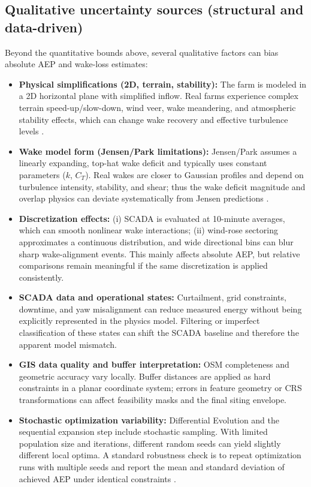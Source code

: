 \documentclass[lettersize,journal]{IEEEtran}
\begin{document}
\subsection{Qualitative uncertainty sources (structural and data-driven)}
\label{subsec:error_qual}

Beyond the quantitative bounds above, several qualitative factors can bias absolute AEP and wake-loss estimates:

\begin{itemize}
    \item \textbf{Physical simplifications (2D, terrain, stability):} The farm is modeled in a 2D horizontal plane with simplified inflow. Real farms experience complex terrain speed-up/slow-down, wind veer, wake meandering, and atmospheric stability effects, which can change wake recovery and effective turbulence levels \cite{shakoor2016jensenreview}.
    \item \textbf{Wake model form (Jensen/Park limitations):} Jensen/Park assumes a linearly expanding, top-hat wake deficit and typically uses constant parameters ($k$, $C_T$). Real wakes are closer to Gaussian profiles and depend on turbulence intensity, stability, and shear; thus the wake deficit magnitude and overlap physics can deviate systematically from Jensen predictions \cite{katic1987jensen,shakoor2016jensenreview}.
    \item \textbf{Discretization effects:} (i) SCADA is evaluated at 10-minute averages, which can smooth nonlinear wake interactions; (ii) wind-rose sectoring approximates a continuous distribution, and wide directional bins can blur sharp wake-alignment events. This mainly affects absolute AEP, but relative comparisons remain meaningful if the same discretization is applied consistently.
    \item \textbf{SCADA data and operational states:} Curtailment, grid constraints, downtime, and yaw misalignment can reduce measured energy without being explicitly represented in the physics model. Filtering or imperfect classification of these states can shift the SCADA baseline and therefore the apparent model mismatch.
    \item \textbf{GIS data quality and buffer interpretation:} OSM completeness and geometric accuracy vary locally. Buffer distances are applied as hard constraints in a planar coordinate system; errors in feature geometry or CRS transformations can affect feasibility masks and the final siting envelope.
    \item \textbf{Stochastic optimization variability:} Differential Evolution and the sequential expansion step include stochastic sampling. With limited population size and iterations, different random seeds can yield slightly different local optima. A standard robustness check is to repeat optimization runs with multiple seeds and report the mean and standard deviation of achieved AEP under identical constraints \cite{herbertacero2014review}.
\end{itemize}
\end{document}
